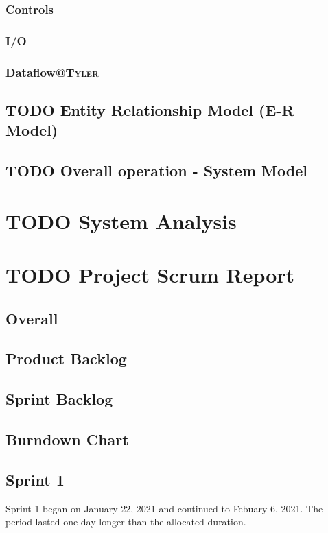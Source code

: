 \documentclass[11pt]{article}
\begin{document}
\subsubsection{Controls}
\label{sec:orge9a7ffc}
\subsubsection{I/O}
\label{sec:orga0d9841}
\subsubsection{Dataflow\hfill{}\textsc{@Tyler}}
\label{sec:org31f7bd8}
\subsection{{\bfseries\sffamily TODO} Entity Relationship Model (E-R Model)}
\label{sec:org45ed458}
\subsection{{\bfseries\sffamily TODO} Overall operation - System Model}
\label{sec:org49d2edd}
\section{{\bfseries\sffamily TODO} System Analysis}
\label{sec:org76bfca0}

\section{{\bfseries\sffamily TODO} Project Scrum Report}
\label{sec:org7495096}
\subsection{Overall}
\label{sec:orgaf86fa2}
\subsection{Product Backlog}
\label{sec:orge7aaca8}
\subsection{Sprint Backlog}
\label{sec:org73af022}
\subsection{Burndown Chart}
\label{sec:orgd97450a}
\subsection{Sprint 1}
\label{sec:org208e456}
Sprint 1 began on January 22, 2021 and continued to Febuary
6, 2021. The period lasted one day longer than the allocated duration.
\end{document}
